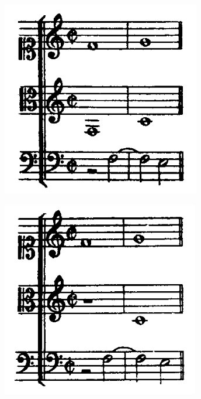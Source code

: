 \begin{enumerate}[wide, label=\bfseries 4.P\arabic*]
    \vspace{.5cm}
    \begin{minipage}{0.46\textwidth}
    \centering
    \includegraphics[width=\textwidth]{Images/hidden-fifths-1.png}
    \label{fig:hidden-fifths-1}
    \end{minipage}
    \hfill
    \begin{minipage}{0.46\textwidth}
      \centering
      \includegraphics[width=\textwidth]{Images/hidden-fifths-2.png}
      \label{fig:hidden-fifths-2}
    \end{minipage}

\end{enumerate}

